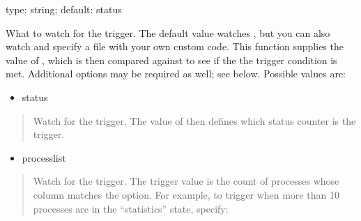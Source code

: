\documentclass[letterpaper,10pt,english]{sphinxmanual}
\begin{document}
\begin{fulllineitems}
\label{\detokenize{mariadb-stat:cmdoption-mariadb-stat-function}}
\sphinxAtStartPar
type: string; default: status

\sphinxAtStartPar
What to watch for the trigger.  The default value watches
, but you can also watch  and specify
a file with your own custom code.  This function supplies the value of
{\hyperref[\detokenize{mariadb-stat:cmdoption-mariadb-stat-variable}]{}}, which is then compared against {\hyperref[\detokenize{mariadb-stat:cmdoption-mariadb-stat-threshold}]{}} to see if the
the trigger condition is met.  Additional options may be required as
well; see below. Possible values are:
\begin{itemize}
\item {} 
\sphinxAtStartPar
status

\end{itemize}
\begin{quote}

\sphinxAtStartPar
Watch  for the trigger.  The value of
{\hyperref[\detokenize{mariadb-stat:cmdoption-mariadb-stat-variable}]{}} then defines which status counter is the trigger.
\end{quote}
\begin{itemize}
\item {} 
\sphinxAtStartPar
processlist

\end{itemize}
\begin{quote}

\sphinxAtStartPar
Watch  for the trigger.  The trigger
value is the count of processes whose {\hyperref[\detokenize{mariadb-stat:cmdoption-mariadb-stat-variable}]{}} column matches the
{\hyperref[\detokenize{mariadb-stat:cmdoption-mariadb-stat-match}]{}} option.  For example, to trigger {\hyperref[\detokenize{mariadb-stat:cmdoption-mariadb-stat-collect}]{}} when more than
10 processes are in the “statistics” state, specify:


\end{quote}
\end{fulllineitems}
\end{document}
